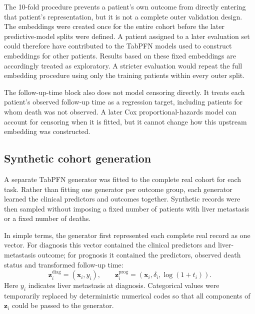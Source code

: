 The 10-fold procedure prevents a patient's own outcome from directly entering
that patient's representation, but it is not a complete outer validation design.
The embeddings were created once for the entire cohort before the later
predictive-model splits were defined. A patient assigned to a later evaluation
set could therefore have contributed to the TabPFN models used to construct
embeddings for other patients. Results based on these fixed embeddings are
accordingly treated as exploratory. A stricter evaluation would repeat the full
embedding procedure using only the training patients within every outer split.

The follow-up-time block also does not model censoring directly. It treats each
patient's observed follow-up time as a regression target, including patients for
whom death was not observed. A later Cox proportional-hazards model can account
for censoring when it is fitted, but it cannot change how this upstream embedding
was constructed.

\subsection{Synthetic cohort generation}
\label{sec:transforms:synthesis}

A separate TabPFN generator was fitted to the complete real cohort for each task.
Rather than fitting one generator per outcome group, each generator learned the
clinical predictors and outcomes together. Synthetic records were then sampled
without imposing a fixed number of patients with liver metastasis or a fixed
number of deaths.

In simple terms, the generator first represented each complete real record as
one vector. For diagnosis this vector contained the clinical predictors and
liver-metastasis outcome; for prognosis it contained the predictors, observed
death status and transformed follow-up time:
\begin{equation}
  \mathbf{z}^{\mathrm{diag}}_i=(\mathbf{x}_i,y_i),
  \qquad
  \mathbf{z}^{\mathrm{prog}}_i=(\mathbf{x}_i,\delta_i,\log(1+t_i)).
  \label{eq:transforms:synthetic-records}
\end{equation}
Here $y_i$ indicates liver metastasis at diagnosis. Categorical values were
temporarily replaced by deterministic numerical codes so that all components of
$\mathbf{z}_i$ could be passed to the generator.

